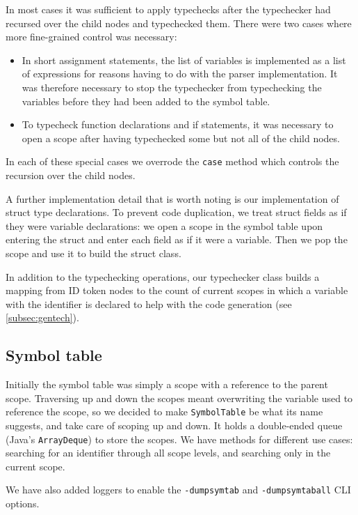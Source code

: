 \documentclass[oneside]{article}
\begin{document}
In most cases it was sufficient to apply typechecks after the typechecker had recursed over the child nodes and typechecked them. There were two cases where more fine-grained control was necessary:

\begin{itemize}
    \item In short assignment statements, the list of variables is implemented as a list of expressions for reasons having to do with the parser implementation. It was therefore necessary to stop the typechecker from typechecking the variables before they had been added to the symbol table.
    \item To typecheck function declarations and if statements, it was necessary to open a scope after having typechecked some but not all of the child nodes.
\end{itemize}

In each of these special cases we overrode the \verb|case| method which controls the recursion over the child nodes.

A further implementation detail that is worth noting is our implementation of struct type declarations. To prevent code duplication, we treat struct fields as if they were variable declarations: we open a scope in the symbol table upon entering the struct and enter each field as if it were a variable. Then we pop the scope and use it to build the struct class.

In addition to the typechecking operations, our typechecker class builds a mapping from ID token nodes to the count of current scopes in which a variable with the identifier is declared to help with the code generation (see \ref{subsec:gentech}).

\subsection{Symbol table}

Initially the symbol table was simply a scope with a reference to the parent scope. Traversing up and down the scopes meant overwriting the variable used to reference the scope, so we decided to make \texttt{SymbolTable} be what its name suggests, and take care of scoping up and down. It holds a double-ended queue (Java's \texttt{ArrayDeque}) to store the scopes. We have methods for different use cases: searching for an identifier through all scope levels, and searching only in the current scope.

We have also added loggers to enable the \verb|-dumpsymtab| and \verb|-dumpsymtaball| CLI options.
\end{document}
